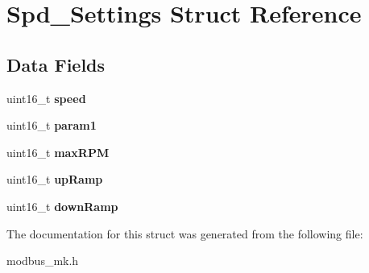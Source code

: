 \hypertarget{struct_spd___settings}{\section{Spd\+\_\+\+Settings Struct Reference}
\label{struct_spd___settings}
}
\subsection*{Data Fields}
\begin{DoxyCompactItemize}
\item 
\hypertarget{struct_spd___settings_a59ce628eaf3b710aa50afbe015ff0898}{uint16\+\_\+t {\bfseries speed}}\label{struct_spd___settings_a59ce628eaf3b710aa50afbe015ff0898}

\item 
\hypertarget{struct_spd___settings_a402baa8e8a697bbf87de1ed4cf9f6627}{uint16\+\_\+t {\bfseries param1}}\label{struct_spd___settings_a402baa8e8a697bbf87de1ed4cf9f6627}

\item 
\hypertarget{struct_spd___settings_af47d1e0c9da2497e819c12ecf7a3b9d0}{uint16\+\_\+t {\bfseries max\+R\+P\+M}}\label{struct_spd___settings_af47d1e0c9da2497e819c12ecf7a3b9d0}

\item 
\hypertarget{struct_spd___settings_a16f1cc3f4021c8e8cd8e14175ac0ba88}{uint16\+\_\+t {\bfseries up\+Ramp}}\label{struct_spd___settings_a16f1cc3f4021c8e8cd8e14175ac0ba88}

\item 
\hypertarget{struct_spd___settings_a19db5e7c4993f3f2343d27998c3c9e5a}{uint16\+\_\+t {\bfseries down\+Ramp}}\label{struct_spd___settings_a19db5e7c4993f3f2343d27998c3c9e5a}

\end{DoxyCompactItemize}


The documentation for this struct was generated from the following file\+:\begin{DoxyCompactItemize}
\item 
modbus\+\_\+mk.\+h\end{DoxyCompactItemize}
